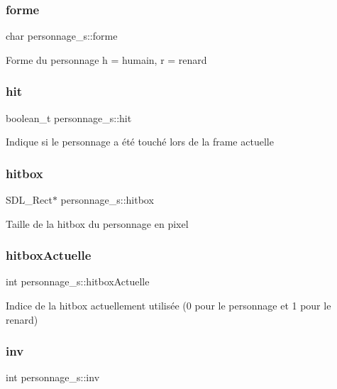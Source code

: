 \subsubsection{\texorpdfstring{forme}{forme}}
{\footnotesize\ttfamily char personnage\+\_\+s\+::forme}

Forme du personnage h = humain, r = renard \mbox{\label{structpersonnage__s_a4e8b537e5d529d22745957acb499d00c}} 
\subsubsection{\texorpdfstring{hit}{hit}}
{\footnotesize\ttfamily boolean\+\_\+t personnage\+\_\+s\+::hit}

Indique si le personnage a été touché lors de la frame actuelle \mbox{\label{structpersonnage__s_a2bb08ca974115a4394ffca5e7e6a3df6}} 
\subsubsection{\texorpdfstring{hitbox}{hitbox}}
{\footnotesize\ttfamily S\+D\+L\+\_\+\+Rect$\ast$ personnage\+\_\+s\+::hitbox}

Taille de la hitbox du personnage en pixel \mbox{\label{structpersonnage__s_adbf4ac9e2b3d716bd5fdc179c865cace}} 
\subsubsection{\texorpdfstring{hitbox\+Actuelle}{hitboxActuelle}}
{\footnotesize\ttfamily int personnage\+\_\+s\+::hitbox\+Actuelle}

Indice de la hitbox actuellement utilisée (0 pour le personnage et 1 pour le renard) \mbox{\label{structpersonnage__s_a1d76a383232b764037a80a8b39b3c378}} 
\subsubsection{\texorpdfstring{inv}{inv}}
{\footnotesize\ttfamily int personnage\+\_\+s\+::inv}


